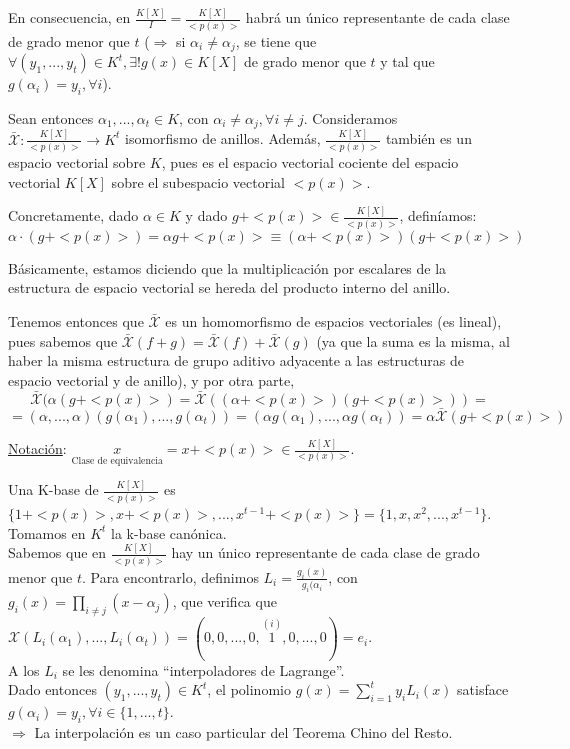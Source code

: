 \documentclass[11pt,a4paper]{article}
\theoremstyle{break}
\begin{document}
En consecuencia, en $\frac{K[X]}{I} = \frac{K[X]}{<p(x)>}$ habrá un único representante de cada clase de grado menor que $t$ ($\Rightarrow$ si $\alpha_{i} \neq \alpha_{j}$, se tiene que $\forall (y_{1}, ..., y_{t}) \in K^{t}, \exists ! g(x) \in K[X]$ de grado menor que $t$ y tal que $g(\alpha_{i}) = y_{i}, \forall i$).

Sean entonces $\alpha_{1}, ..., \alpha_{t} \in K$, con $\alpha_{i} \neq \alpha_{j}, \forall i \neq j$. Consideramos $\bar{\mathcal{X}}: \frac{K[X]}{<p(x)>} \to K^{t}$ isomorfismo de anillos. Además, $\frac{K[X]}{<p(x)>}$ también es un espacio vectorial sobre $K$, pues es el espacio vectorial cociente del espacio vectorial $K[X]$ sobre el subespacio vectorial $<p(x)>$.

Concretamente, dado $\alpha \in K$ y dado $g + <p(x)> \in \frac{K[X]}{<p(x)>}$, definíamos:
$$\alpha \cdot (g + <p(x)>) = \alpha g + <p(x)> \equiv (\alpha + <p(x)>)(g + <p(x)>)$$

Básicamente, estamos diciendo que la multiplicación por escalares de la estructura de espacio vectorial se hereda del producto interno del anillo.

Tenemos entonces que $\bar{\mathcal{X}}$ es un homomorfismo de espacios vectoriales (es lineal), pues sabemos que $\bar{\mathcal{X}}(f + g) = \bar{\mathcal{X}}(f) + \bar{\mathcal{X}}(g)$ (ya que la suma es la misma, al haber la misma estructura de grupo aditivo adyacente a las estructuras de espacio vectorial y de anillo), y por otra parte,
$$\bar{\mathcal{X}}(\alpha(g + <p(x)>) = \bar{\mathcal{X}}((\alpha + <p(x)>)(g + <p(x)>)) =$$
$$= (\alpha, ..., \alpha)(g(\alpha_{1}), ..., g(\alpha_{t})) = (\alpha g(\alpha_{1}), ..., \alpha g(\alpha_{t})) = \alpha \bar{\mathcal{X}}(g + <p(x)>)$$

\underline{Notación}: $\underset{\text{Clase de equivalencia}}{x} = x + <p(x)> \in \frac{K[X]}{<p(x)>}$.

Una K-base de $\frac{K[X]}{<p(x)>}$ es $\{1 + <p(x)>, x + <p(x)>, ..., x^{t-1} + <p(x)>\} = \{1, x, x^{2}, ..., x^{t-1}\}$. \\
Tomamos en $K^{t}$ la k-base canónica. \\
Sabemos que en $\frac{K[X]}{<p(x)>}$ hay un único representante de cada clase de grado menor que $t$. Para encontrarlo, definimos $L_{i} = \frac{g_{i}(x)}{g_{i}(\alpha_{i}}$, con $g_{i}(x) = \prod_{i \neq j} (x - \alpha_{j})$, que verifica que $\mathcal{X} (L_{i}(\alpha_{1}), ..., L_{i}(\alpha_{t})) = (0, 0, ..., 0, \overset{(i)}{1}, 0, ..., 0) = e_{i}$. \\
A los $L_{i}$ se les denomina ``interpoladores de Lagrange''. \\
Dado entonces $(y_{1}, ..., y_{t}) \in K^{t}$, el polinomio $g(x) = \sum_{i=1}^{t} y_{i}L_{i}(x)$ satisface $g(\alpha_{i}) = y_{i}, \forall i \in \{1, ..., t\}$. \\
$\Rightarrow$ La interpolación es un caso particular del Teorema Chino del Resto.
\end{document}
